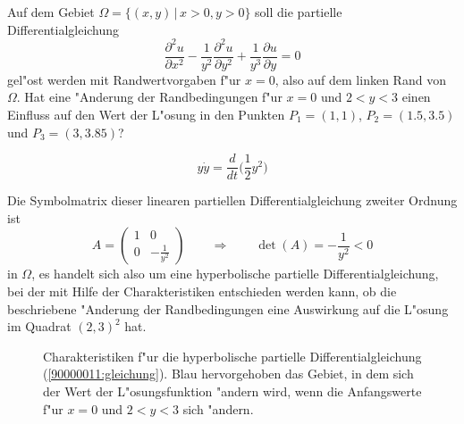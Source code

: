 Auf dem Gebiet $\Omega=\{(x,y)\,|\, x>0, y>0\}$ soll die partielle
Differentialgleichung
\begin{equation}
\frac{\partial^2 u}{\partial x^2}-\frac1{y^2}\frac{\partial^2 u}{\partial y^2} 
+
\frac1{y^3}\frac{\partial u}{\partial y}=0
\label{90000011:gleichung}
\end{equation}
gel"ost werden mit Randwertvorgaben f"ur $x=0$, also auf dem linken Rand von
$\Omega$.
Hat eine "Anderung der Randbedingungen f"ur $x=0$ und $2 < y<3$ einen
Einfluss auf den Wert der L"osung in den Punkten
$P_1=(1,1)$,
$P_2=(1.5,3.5)$ und
$P_3=(3,3.85)$?

\begin{hinweis}
\[
y\dot y=\frac{d}{dt}\bigl(
{\textstyle \frac12}y^2
\bigr)
\]
\end{hinweis}

\begin{loesung}
Die Symbolmatrix dieser linearen partiellen Differentialgleichung zweiter
Ordnung ist
\[
A=\begin{pmatrix}
1&0\\
0&-\frac1{y^2}
\end{pmatrix}
\qquad
\Rightarrow
\qquad
\det(A)=-\frac1{y^2}<0
\]
in $\Omega$, es handelt sich also um eine hyperbolische partielle
Differentialgleichung, bei der mit Hilfe der Charakteristiken entschieden
werden kann, ob die beschriebene "Anderung der Randbedingungen eine 
Auswirkung auf die L"osung im Quadrat $(2,3)^2$ hat.
\begin{figure}
\begin{center}
\end{center}
\caption{Charakteristiken f"ur die hyperbolische partielle
Differentialgleichung (\ref{90000011:gleichung}).
Blau hervorgehoben das Gebiet, in dem sich der Wert der L"osungsfunktion
"andern wird, wenn die Anfangswerte f"ur $x=0$ und $2<y<3$ sich "andern.
\label{90000011:bild}}
\end{figure}


\end{loesung}
